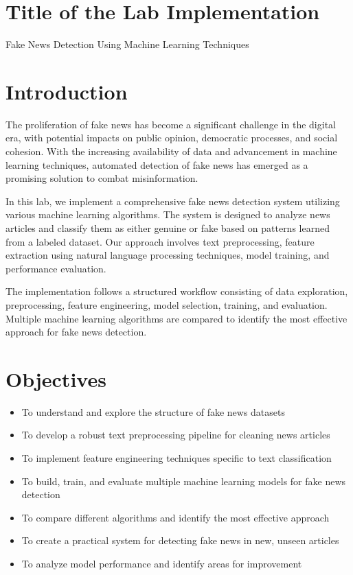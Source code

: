 \documentclass[12pt]{article}
\begin{document}
\newpage
{}


\section{Title of the Lab Implementation}
Fake News Detection Using Machine Learning Techniques

\section{Introduction}
The proliferation of fake news has become a significant challenge in the digital era, with potential impacts on public opinion, democratic processes, and social cohesion. With the increasing availability of data and advancement in machine learning techniques, automated detection of fake news has emerged as a promising solution to combat misinformation.

In this lab, we implement a comprehensive fake news detection system utilizing various machine learning algorithms. The system is designed to analyze news articles and classify them as either genuine or fake based on patterns learned from a labeled dataset. Our approach involves text preprocessing, feature extraction using natural language processing techniques, model training, and performance evaluation.

The implementation follows a structured workflow consisting of data exploration, preprocessing, feature engineering, model selection, training, and evaluation. Multiple machine learning algorithms are compared to identify the most effective approach for fake news detection.

\section{Objectives}
\begin{itemize}
    \item To understand and explore the structure of fake news datasets
    \item To develop a robust text preprocessing pipeline for cleaning news articles
    \item To implement feature engineering techniques specific to text classification
    \item To build, train, and evaluate multiple machine learning models for fake news detection
    \item To compare different algorithms and identify the most effective approach
    \item To create a practical system for detecting fake news in new, unseen articles
    \item To analyze model performance and identify areas for improvement
\end{itemize}
\end{document}
